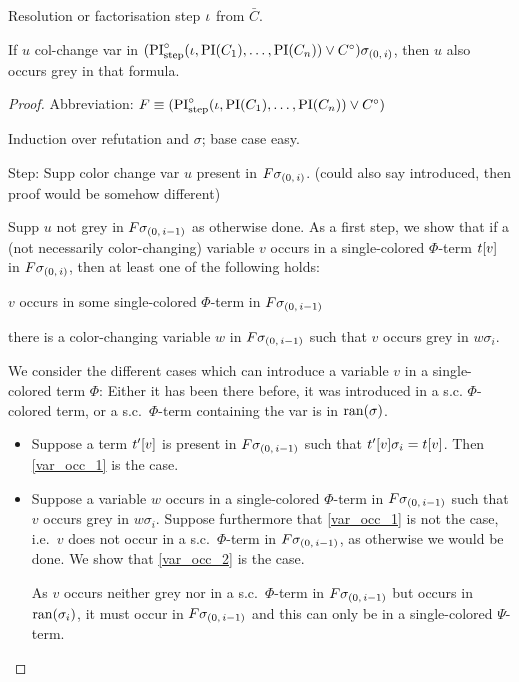 \documentclass[,%
	draft=false,%
	numbers=noendperiod
	12pt,
	a4paper,
	oneside,%
	openany,
]{memoir}
\begin{document}
\begin{lemma}
	\label{lemma:col_change}
	Resolution or factorisation step $\iota$ from $\bar C$.

	If $u$ col-change var in $(\operatorname{PI}^\circ_{\mathrm{step}}(\iota, \operatorname{PI}(C_1), \dots, \operatorname{PI}(C_n)) \lor C^\circ)\sigma_{(0,\,i)}$, then $u$ also occurs grey in that formula.
\end{lemma}
\begin{proof}
	Abbreviation: $F \equiv (\operatorname{PI}^\circ_{\mathrm{step}}(\iota, \operatorname{PI}(C_1), \dots, \operatorname{PI}(C_n)) \lor C^\circ)$

	Induction over refutation and $\sigma$; base case easy.

	Step:
	Supp color change var $u$ present in 
	$F\sigma_{(0,\,i)}$. (could also say introduced, then proof would be somehow different)

	Supp $u$ not grey in 
	$F\sigma_{(0,\,i-1)}$ as otherwise done.
	As a first step, we show that if a (not necessarily color-changing) variable $v$ occurs in a single-colored $\Phi$-term $t[v]$ in $F\sigma_{(0,\,i)}$,
	then at least one of the following holds:
	\begin{compactenum}
	\item $v$ occurs in some single-colored $\Phi$-term in $F\sigma_{(0,\,i-1)}$ \label{var_occ_1}
	\item there is a color-changing variable $w$ in $F\sigma_{(0,\,i-1)}$ such that $v$ occurs grey in $w\sigma_i$.  \label{var_occ_2}
	\end{compactenum}
	We consider the different cases which can introduce a variable $v$ in a single-colored term $\Phi$: Either it has been there before, it was introduced in a s.c. $\Phi$-colored term, or a s.c.\ $\Phi$-term containing the var is in $\operatorname{ran}(\sigma)$.
	\begin{itemize}
		\item
			Suppose a term $t'[v]$ is present in $F\sigma_{(0,\,i-1)}$ such that $t'[v]\sigma_i = t[v]$.
			Then \ref{var_occ_1} is the case.
		\item
			Suppose a variable $w$ occurs in a single-colored $\Phi$-term in $F\sigma_{(0,\,i-1)}$ such that $v$ occurs grey in $w\sigma_i$.
			Suppose furthermore that \ref{var_occ_1} is not the case, i.e.\ $v$ does not occur in a s.c.\ $\Phi$-term in $F\sigma_{(0,\,i-1)}$, as otherwise we would be done.
			We show that \ref{var_occ_2} is the case.

			As $v$ occurs neither grey nor in a s.c.\ $\Phi$-term in $F\sigma_{(0,\,i-1)}$ but occurs in $\operatorname{ran}(\sigma_i)$, it must occur in $F\sigma_{(0,\,i-1)}$ and this can only be in a single-colored $\Psi$-term.


\end{itemize}
\end{proof}
\end{document}
